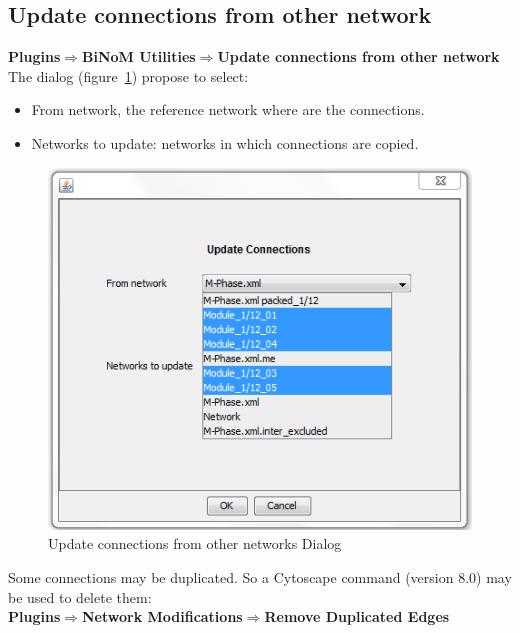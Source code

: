 \subsection{Update connections from other network}
\textbf{Plugins$\Rightarrow$BiNoM Utilities$\Rightarrow$Update connections from other network}\\
The dialog (figure~\ref{Update_connections}) propose to select:
\begin{itemize}
\item From network, the reference network where are the connections.
\item Networks to update: networks in which connections are copied.
\end{itemize}
\begin{figure}[h]
\centering
\includegraphics[width=14 cm]{graphics/Update_connections}
\caption{Update connections from other networks Dialog}
\label{Update_connections}
\end{figure}
Some connections may be duplicated. So a Cytoscape command (version 8.0) may be used to delete them:\\
\textbf{Plugins$\Rightarrow$Network Modifications$\Rightarrow$Remove Duplicated Edges}

